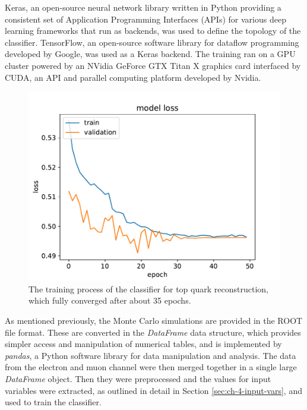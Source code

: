 Keras, an open-source neural network library written in Python providing a consistent set of Application Programming Interfaces (APIs) for various deep learning frameworks that run as backends, was used to define the topology of the classifier. TensorFlow, an open-source software library for dataflow programming developed by Google, was used as a Keras backend. The training ran on a GPU cluster powered by an NVidia GeForce GTX Titan X \cite{misc:geforce} graphics card interfaced by CUDA, an API and parallel computing platform developed by Nvidia.

\begin{figure}[h]
    \centering
    \includegraphics[scale=.75]{assets/chap04/model_loss.pdf}
    \caption{The training process of the classifier for top quark reconstruction, which fully converged after about 35 epochs.}
    \label{fig:ch_4_loss}
\end{figure}

As mentioned previously, the Monte Carlo simulations are provided in the ROOT file format. These are converted in the \emph{DataFrame} data structure, which provides simpler access and manipulation of numerical tables, and is implemented by \emph{pandas}, a Python software library for data manipulation and analysis. The data from the electron and muon channel were then merged together in a single large \emph{DataFrame} object. Then they were preprocessed and the values for input variables were extracted, as outlined in detail in Section \ref{sec:ch-4-input-vars}, and used to train the classifier.

